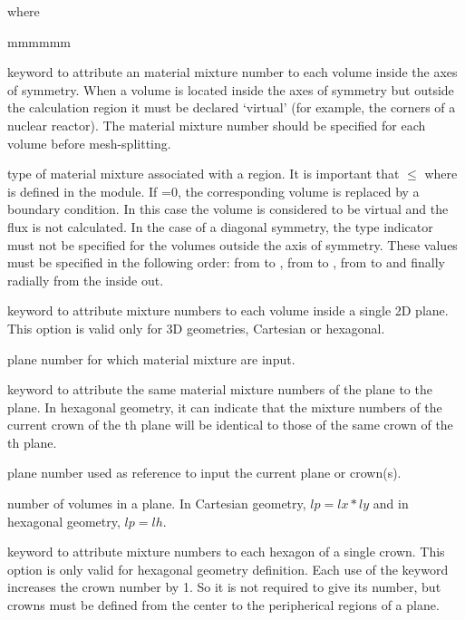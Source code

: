 \noindent where
\begin{ListeDeDescription}{mmmmmm}

\item[\moc{MIX}] keyword to attribute an material mixture number to each volume inside the axes of symmetry. When a volume is located inside the axes of symmetry but outside the calculation region it must be declared `virtual' (for example, the corners of a nuclear reactor). The material mixture number should be specified for each volume before mesh-splitting.

\item[\dusa{imix}] type of material mixture associated with a region. It is
important that $\le$ where  is defined in the
{\tt } module. If =0, the corresponding volume is replaced by a
 boundary condition. In this case the volume is considered to be
virtual and the flux is not calculated. In the case of a diagonal symmetry, the
type indicator must not be specified for the volumes outside the axis of
symmetry. These values must be specified in the following order:  from 
to , from  to , from  to  and finally
radially from the inside out. 

\item[\moc{PLANE}]  keyword to attribute mixture numbers to each volume inside a single 2D plane. This option is 
valid only for 3D geometries, Cartesian or hexagonal. 

\item[\dusa{iplan}] plane number for which material mixture are input. 

\item[\moc{SAME}]  keyword to attribute the same material mixture numbers of the  plane to the  plane. In 
hexagonal geometry, it can indicate that the mixture numbers of the current crown of the th 
plane will be identical to those of the same crown of the th plane. 

\item[\dusa{iplan1}] plane number used as reference to input the current plane or crown(s). 

\item[\dusa{lp}] number of volumes in a plane. In Cartesian geometry, $lp=lx*ly$ and in hexagonal geometry, 
$lp=lh$. 

\item[\moc{CROWN}]  keyword to attribute mixture numbers to each hexagon of a single crown. This option is only 
valid for  hexagonal geometry definition. Each use of the keyword  increases 
the crown number by 1. So it is not required to give its number, but crowns must be defined from 
the center to the peripherical regions of a plane. 


\end{ListeDeDescription}
